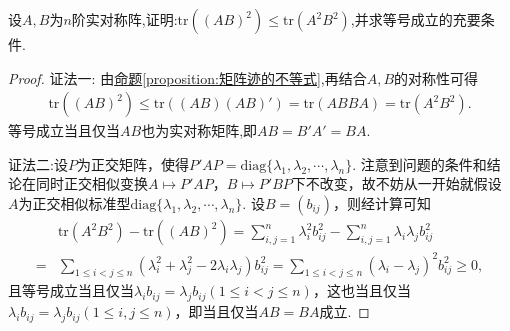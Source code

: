 \documentclass[../../main.tex]{subfiles}
\begin{document}
\begin{example}
设\(A,B\)为\(n\)阶实对称阵,证明:\(\text{tr}((AB)^2)\leqslant \text{tr}(A^2B^2)\),并求等号成立的充要条件.
\end{example}
\begin{proof}
{\color{blue}证法一:}
由\hyperref[proposition:矩阵迹的不等式]{命题\ref{proposition:矩阵迹的不等式}},再结合$A,B$的对称性可得
\begin{align*}
\mathrm{tr}\left( \left( AB \right) ^2 \right) \leqslant \mathrm{tr}\left( \left( AB \right) \left( AB \right) ' \right) =\mathrm{tr}\left( ABBA \right) =\mathrm{tr}\left( A^2B^2 \right) .
\end{align*}
等号成立当且仅当$AB$也为实对称矩阵,即\(AB = B'A'=BA\).

{\color{blue}证法二:}设\(P\)为正交矩阵，使得\(P'AP = \mathrm{diag}\{\lambda_1,\lambda_2,\cdots,\lambda_n\}\). 注意到问题的条件和结论在同时正交相似变换\(A\mapsto P'AP\)，\(B\mapsto P'BP\)下不改变，故不妨从一开始就假设\(A\)为正交相似标准型\(\mathrm{diag}\{\lambda_1,\lambda_2,\cdots,\lambda_n\}\). 设\(B=(b_{ij})\)，则经计算可知
\begin{align*}
&\mathrm{tr}(A^2B^2)-\mathrm{tr}((AB)^2)=\sum_{i,j = 1}^{n}\lambda_i^2b_{ij}^2-\sum_{i,j = 1}^{n}\lambda_i\lambda_jb_{ij}^2\\
=&\sum_{1\leqslant  i<j\leqslant  n}(\lambda_i^2+\lambda_j^2 - 2\lambda_i\lambda_j)b_{ij}^2=\sum_{1\leqslant  i<j\leqslant  n}(\lambda_i - \lambda_j)^2b_{ij}^2\geqslant 0,
\end{align*}
且等号成立当且仅当\(\lambda_ib_{ij}=\lambda_jb_{ij}(1\leqslant  i<j\leqslant  n)\)，这也当且仅当\(\lambda_ib_{ij}=\lambda_jb_{ij}(1\leqslant  i,j\leqslant  n)\)，即当且仅当\(AB = BA\)成立. 

\end{proof}
\end{document}

